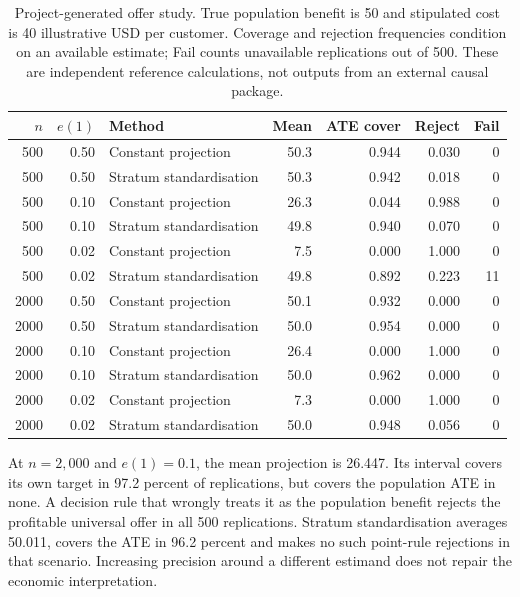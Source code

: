 \begin{table}[htbp]
\centering\small
\begin{tabular}{rrlrrrr}
\toprule
$n$ & $e(1)$ & Method & Mean & ATE cover & Reject & Fail \\
\midrule
500 & 0.50 & Constant projection & 50.3 & 0.944 & 0.030 & 0 \\
500 & 0.50 & Stratum standardisation & 50.3 & 0.942 & 0.018 & 0 \\
500 & 0.10 & Constant projection & 26.3 & 0.044 & 0.988 & 0 \\
500 & 0.10 & Stratum standardisation & 49.8 & 0.940 & 0.070 & 0 \\
500 & 0.02 & Constant projection & 7.5 & 0.000 & 1.000 & 0 \\
500 & 0.02 & Stratum standardisation & 49.8 & 0.892 & 0.223 & 11 \\
2000 & 0.50 & Constant projection & 50.1 & 0.932 & 0.000 & 0 \\
2000 & 0.50 & Stratum standardisation & 50.0 & 0.954 & 0.000 & 0 \\
2000 & 0.10 & Constant projection & 26.4 & 0.000 & 1.000 & 0 \\
2000 & 0.10 & Stratum standardisation & 50.0 & 0.962 & 0.000 & 0 \\
2000 & 0.02 & Constant projection & 7.3 & 0.000 & 1.000 & 0 \\
2000 & 0.02 & Stratum standardisation & 50.0 & 0.948 & 0.056 & 0 \\
\bottomrule
\end{tabular}
\caption{Project-generated offer study. True population benefit is 50 and
stipulated cost is 40 illustrative USD per customer. Coverage and rejection
frequencies condition on an available estimate; Fail counts unavailable
replications out of 500. These are independent reference calculations,
not outputs from an external causal package.}
\label{scisyn:offer-results}
\end{table}




At $n=2{,}000$ and $e(1)=0.1$, the mean projection is 26.447. Its interval covers
its own target in 97.2 percent of replications, but covers the population ATE in
none. A decision rule that wrongly treats it as the population benefit rejects
the profitable universal offer in all 500 replications. Stratum standardisation
averages 50.011, covers the ATE in 96.2 percent and makes no such point-rule
rejections in that scenario. Increasing precision around a different estimand
does not repair the economic interpretation.

